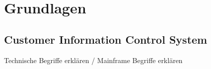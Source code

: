 \chapter{Grundlagen}\label{ch:grundlagen}

\section{Customer Information Control System}\label{cics}

Technische Begriffe erklären / Mainframe Begriffe erklären

